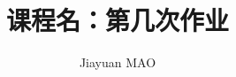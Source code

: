 \documentclass[a4paper, 12pt]{article}
\begin{document}
\setlength{\parindent}{2em}

\title{课程名：第几次作业}
\author{Jiayuan MAO} 
\date{}
\maketitle


\end{document}
